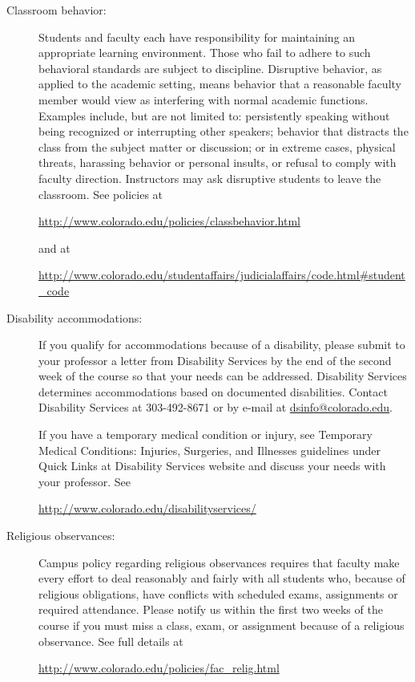\documentclass[11pt]{article}
\begin{document}
\begin{description}
\item[Classroom behavior:] Students and faculty each have
  responsibility for maintaining an appropriate learning
  environment. Those who fail to adhere to such behavioral standards
  are subject to discipline.  Disruptive behavior, as applied to the
  academic setting, means behavior that a reasonable faculty member
  would view as interfering with normal academic functions. Examples
  include, but are not limited to: persistently speaking without being
  recognized or interrupting other speakers; behavior that distracts
  the class from the subject matter or discussion; or in extreme
  cases, physical threats, harassing behavior or personal insults, or
  refusal to comply with faculty direction. Instructors may ask
  disruptive students to leave the classroom.  See policies at
  \begin{center}
    \url{http://www.colorado.edu/policies/classbehavior.html}
  \end{center}
  and at
  \begin{center} \url{http://www.colorado.edu/studentaffairs/judicialaffairs/code.html#student_code}
  \end{center}

\item[Disability accommodations:] If you qualify for accommodations
  because of a disability, please submit to your professor a letter
  from Disability Services by the end of the second week of the course
  so that your needs can be addressed. Disability Services determines
  accommodations based on documented disabilities. Contact Disability
  Services at 303-492-8671 or by e-mail at
  \href{mailto:dsinfo@colorado.edu}{dsinfo@colorado.edu}.

  If you have a temporary medical condition or injury, see Temporary
  Medical Conditions: Injuries, Surgeries, and Illnesses guidelines
  under Quick Links at Disability Services website and discuss your
  needs with your professor. See
  \begin{center}
    \url{http://www.colorado.edu/disabilityservices/}
  \end{center}

\item[Religious observances:] Campus policy regarding religious
  observances requires that faculty make every effort to deal
  reasonably and fairly with all students who, because of religious
  obligations, have conflicts with scheduled exams, assignments or
  required attendance.  Please notify us within the first two weeks of
  the course if you must miss a class, exam, or assignment because of
  a religious observance.  See full details at
  \begin{center}
    \url{http://www.colorado.edu/policies/fac_relig.html}
  \end{center}


\end{description}
\end{document}
